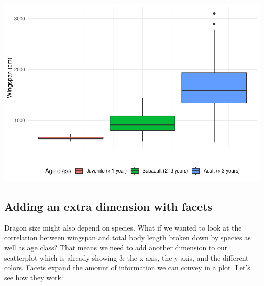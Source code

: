 \documentclass[
]{book}
\begin{document}
\includegraphics{reproducible-science_files/figure-latex/gg22-1.pdf}

\hypertarget{adding-an-extra-dimension-with-facets}{%
\subsection{Adding an extra dimension with facets}\label{adding-an-extra-dimension-with-facets}}

Dragon size might also depend on species. What if we wanted to look at the
correlation between wingspan and total body length broken down by species as
well as age class? That means we need to add another dimension to our scatterplot
which is already showing 3: the x axis, the y axis, and the different colors.
Facets expand the amount of information we can convey in a plot. Let's see how
they work:
\end{document}
